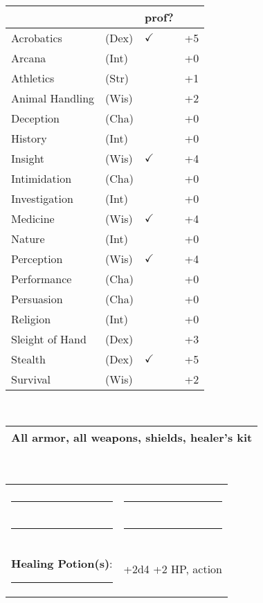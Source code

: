 \documentclass[twocolumn]{article}
\begin{document}
\\
\noindent\begin{tabular}{llll}
 & & prof? & \\
\hline
Acrobatics & (Dex) & $\checkmark$ &+5 \\
Arcana & (Int) &  & +0 \\ 
Athletics & (Str) &  & +1\\
Animal Handling & (Wis) &  & +2\\
Deception & (Cha) &  & +0 \\
History & (Int) &  & +0 \\
Insight & (Wis) & $\checkmark$ & +4 \\
Intimidation & (Cha) &  & +0 \\
Investigation & (Int) &  & +0 \\
Medicine & (Wis) & $\checkmark$ & +4 \\
Nature & (Int) &  & +0 \\
Perception & (Wis) & $\checkmark$ & +4 \\
Performance & (Cha) &  & +0 \\
Persuasion & (Cha) &  & +0 \\
Religion & (Int) &  & +0 \\
Sleight of Hand & (Dex) &  & +3 \\
Stealth & (Dex) & $\checkmark$ & +5 \\
Survival & (Wis) &  & +2 \\
\hline
\end{tabular}
\vspace{12pt}

\\
\noindent\begin{tabular}{|m{3.1in}|}
\hline
All armor, all weapons, shields, healer's kit \\
\hline
\end{tabular}
\vspace{12pt}


\\
\noindent\begin{tabular}{|ll|}
\hline&\\
\rule{1.4in}{.2pt}&\rule{1.4in}{.2pt}\\
\rule{1.4in}{.2pt}&\rule{1.4in}{.2pt}\\
\textbf{Healing Potion(s)}: \rule{.2in}{.2pt}& +2d4 +2 HP, {\sc action}\\
\hline
\end{tabular}
\vspace{12pt}
\end{document}
